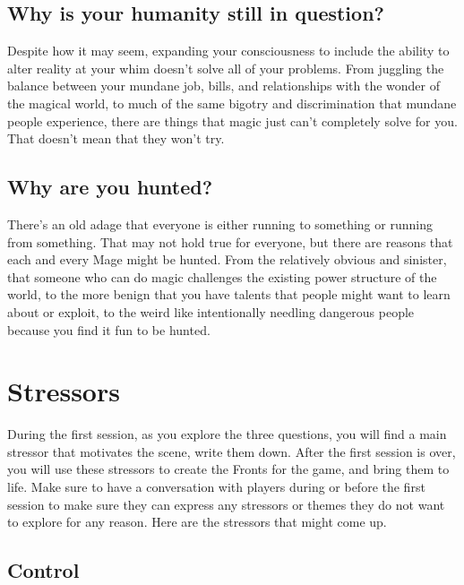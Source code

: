 \documentclass[10pt,twoside,openright]{memoir}
\begin{document}
\hypertarget{why-is-your-humanity-still-in-question}{%
\subsection{Why is your humanity still in
question?}\label{why-is-your-humanity-still-in-question}}

Despite how it may seem, expanding your consciousness to include the
ability to alter reality at your whim doesn't solve all of your
problems. From juggling the balance between your mundane job, bills, and
relationships with the wonder of the magical world, to much of the same
bigotry and discrimination that mundane people experience, there are
things that magic just can't completely solve for you. That doesn't mean
that they won't try.

\hypertarget{why-are-you-hunted}{%
\subsection{Why are you hunted?}\label{why-are-you-hunted}}

There's an old adage that everyone is either running to something or
running from something. That may not hold true for everyone, but there
are reasons that each and every Mage might be hunted. From the
relatively obvious and sinister, that someone who can do magic
challenges the existing power structure of the world, to the more benign
that you have talents that people might want to learn about or exploit,
to the weird like intentionally needling dangerous people because you
find it fun to be hunted.

\hypertarget{stressors}{%
\section{Stressors}\label{stressors}}

During the first session, as you explore the three questions, you will
find a main stressor that motivates the scene, write them down. After
the first session is over, you will use these stressors to create the
Fronts for the game, and bring them to life. Make sure to have a
conversation with players during or before the first session to make
sure they can express any stressors or themes they do not want to
explore for any reason. Here are the stressors that might come up.

\hypertarget{control}{%
\subsection{Control}\label{control}}
\end{document}
